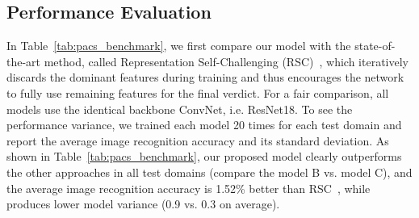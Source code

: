 \documentclass[10pt,twocolumn,letterpaper]{article}
\begin{document}
{
\setlength{\tabcolsep}{4pt}
\renewcommand{\arraystretch}{1.3} 
\begin{table}[t]
	\begin{center}
	    \caption{Image recognition accuracy (\%) comparison with the state-of-the-art approach, RSC~\cite{huangRSC2020}, on PACS~\cite{Li2017dg} test set. We also report standard deviation from a set of 20 models individually trained for each model and each test domain.}
	    \label{tab:pacs_benchmark}
     \end{center}
\end{table}
}
\subsection{Performance Evaluation}
In Table~\ref{tab:pacs_benchmark}, we first compare our model with the state-of-the-art method, called Representation Self-Challenging (RSC)~\cite{huangRSC2020}, which iteratively discards the dominant features during training and thus encourages the network to fully use remaining features for the final verdict. For a fair comparison, all models use the identical backbone ConvNet, i.e. ResNet18. To see the performance variance, we trained each model 20 times for each test domain and report the average image recognition accuracy and its standard deviation. As shown in Table~\ref{tab:pacs_benchmark}, our proposed model clearly outperforms the other approaches in all test domains (compare the model B vs. model C), and the average image recognition accuracy is 1.52\% better than RSC~\cite{li2018domain}, while produces lower model variance (0.9 vs. 0.3 on average). 
\end{document}
